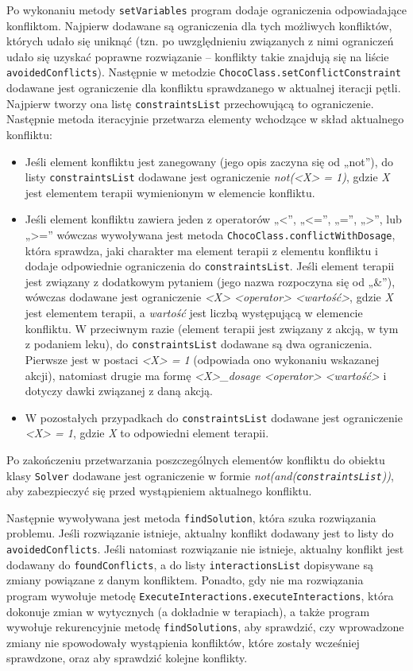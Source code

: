Po wykonaniu metody \texttt{setVariables} program dodaje ograniczenia odpowiadające konfliktom. Najpierw dodawane są ograniczenia dla tych możliwych konfliktów, których udało się uniknąć (tzn. po uwzględnieniu związanych z nimi ograniczeń udało się uzyskać poprawne rozwiązanie -- konflikty takie znajdują się na liście \texttt{avoidedConflicts}). Następnie w metodzie \texttt{ChocoClass.set\-ConflictConstraint} dodawane jest ograniczenie dla konfliktu sprawdzanego w aktualnej iteracji pętli. Najpierw tworzy ona listę \texttt{constraintsList} przechowującą to ograniczenie. Następnie metoda iteracyjnie przetwarza elementy wchodzące w skład aktualnego konfliktu:
\begin{itemize}
\item Jeśli element konfliktu jest zanegowany (jego opis zaczyna się od „not”), do listy \texttt{constraints\-List} dodawane jest ograniczenie \textit{not(<X> = 1)}, gdzie \textit{X} jest elementem terapii wymienionym w elemencie konfliktu. 
\item Jeśli element konfliktu zawiera jeden z operatorów „<”, „<=”, „=”, „>”, lub „>=” wówczas wywoływana jest metoda \texttt{ChocoClass.conflictWithDosage}, która sprawdza, jaki charakter ma element terapii z elementu konfliktu i dodaje odpowiednie ograniczenia do \texttt{constraints\-List}. Jeśli element terapii jest związany z dodatkowym pytaniem (jego nazwa rozpoczyna się od „\&”), wówczas dodawane jest ograniczenie \textit{<X> <operator> <wartość>}, gdzie \textit{X} jest elementem terapii, a \textit{wartość} jest liczbą występującą w elemencie konfliktu. W przeciwnym razie (element terapii jest związany z akcją, w tym z podaniem leku), do \texttt{constraintsList} dodawane są dwa ograniczenia. Pierwsze jest w postaci \textit{<X> = 1} (odpowiada ono wykonaniu wskazanej akcji), natomiast drugie ma formę \textit{<X>\_dosage <operator> <wartość>} i dotyczy dawki związanej z daną akcją. 
\item W pozostałych przypadkach do \texttt{constraintsList} dodawane jest ograniczenie \textit{<X> = 1}, gdzie \textit{X} to odpowiedni element terapii.
\end{itemize}

Po zakończeniu przetwarzania poszczególnych elementów konfliktu do obiektu klasy \texttt{Solver} dodawane jest ograniczenie w formie \textit{not(and(\texttt{constraintsList}))}, aby zabezpieczyć się przed wystąpieniem aktualnego konfliktu.

Następnie wywoływana jest metoda \texttt{findSolution}, która szuka rozwiązania problemu. Jeśli rozwiązanie istnieje, aktualny konflikt dodawany jest to listy do \texttt{avoided\-Conflicts}. Jeśli natomiast rozwiązanie nie istnieje, aktualny konflikt jest dodawany do \texttt{foundConflicts}, a do listy \texttt{interactionsList} dopisywane są zmiany powiązane z danym konfliktem. Ponadto, gdy nie ma rozwiązania program wywołuje metodę \texttt{ExecuteInteractions.execute\-Interactions}, która dokonuje zmian w wytycznych (a dokładnie w terapiach), a także program wywołuje rekurencyjnie metodę \texttt{findSolutions}, aby sprawdzić, czy wprowadzone zmiany nie spowodowały wystąpienia konfliktów, które zostały wcześniej sprawdzone, oraz aby sprawdzić kolejne konflikty. 

